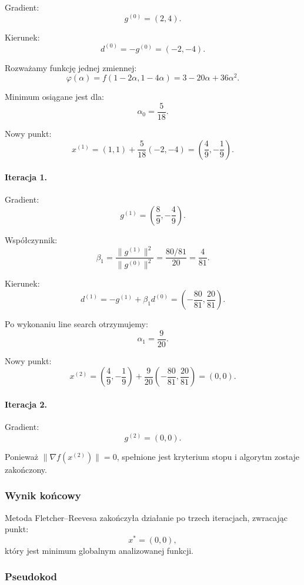 \documentclass[10pt,a4paper]{article}
\begin{document}
Gradient:
\[
g^{(0)} = (2,4).
\]

Kierunek:
\[
d^{(0)} = -g^{(0)} = (-2,-4).
\]

Rozważamy funkcję jednej zmiennej:
\[
\varphi(\alpha) = f(1-2\alpha, 1-4\alpha)
= 3 - 20\alpha + 36\alpha^2.
\]

Minimum osiągane jest dla:
\[
\alpha_0 = \frac{5}{18}.
\]

Nowy punkt:
\[
x^{(1)} =
(1,1) + \frac{5}{18}(-2,-4)
=
\left(\frac{4}{9}, -\frac{1}{9}\right).
\]



\paragraph{Iteracja 1.}

Gradient:
\[
g^{(1)} =
\left(\frac{8}{9}, -\frac{4}{9}\right).
\]

Współczynnik:
\[
\beta_1 =
\frac{\|g^{(1)}\|^2}{\|g^{(0)}\|^2}
=
\frac{80/81}{20}
=
\frac{4}{81}.
\]

Kierunek:
\[
d^{(1)} =
- g^{(1)} + \beta_1 d^{(0)}
=
\left(-\frac{80}{81}, \frac{20}{81}\right).
\]

Po wykonaniu line search otrzymujemy:
\[
\alpha_1 = \frac{9}{20}.
\]

Nowy punkt:
\[
x^{(2)} =
\left(\frac{4}{9}, -\frac{1}{9}\right)
+
\frac{9}{20}
\left(-\frac{80}{81}, \frac{20}{81}\right)
=
(0,0).
\]



\paragraph{Iteracja 2.}

Gradient:
\[
g^{(2)} = (0,0).
\]

Ponieważ $\|\nabla f(x^{(2)})\| = 0$, spełnione jest kryterium stopu
i algorytm zostaje zakończony.



\subsubsection{Wynik końcowy}

Metoda Fletcher--Reevesa zakończyła działanie po trzech iteracjach,
zwracając punkt:
\[
x^* = (0,0),
\]
który jest minimum globalnym analizowanej funkcji.



\subsubsection{Pseudokod}
\end{document}
